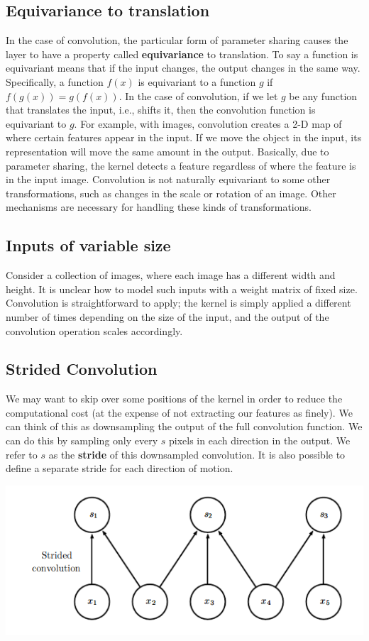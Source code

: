 \subsection{Equivariance to translation}
In the case of convolution, the particular form of parameter sharing causes the layer to have a property called \textbf{equivariance} to translation. To say a function is
equivariant means that if the input changes, the output changes in the same way. Specifically, a function $f(x)$ is equivariant to a function $g$ if $f(g(x)) = g(f(x))$. In the case of convolution, if we let $g$ be any function that translates the input, i.e., shifts it, then the convolution function is equivariant to $g$. For example, with images, convolution creates a 2-D map of where certain features appear in the input. If we move the object in the input, its representation will move the
same amount in the output. Basically, due to parameter sharing, the kernel detects a feature regardless of where the feature is in the input image.\newline\newline
Convolution is not naturally equivariant to some other transformations, such as changes in the scale or rotation of an image. Other mechanisms are necessary for handling these kinds of transformations.

\subsection{Inputs of variable size}
Consider a collection of images, where each image has a different
width and height. It is unclear how to model such inputs with a weight matrix of fixed size. Convolution is straightforward to apply; the kernel is simply applied a different number of times depending on the size of the input, and the output of the convolution operation scales accordingly.

\subsection{Strided Convolution}
We may want to skip over some positions of the kernel in order to reduce the
computational cost (at the expense of not extracting our features as finely).
We can think of this as downsampling the output of the full convolution function. We can do this by sampling only every $s$ pixels in each direction in the output. We refer to $s$ as the \textbf{stride} of this downsampled convolution. It is also possible to define a separate stride for each direction of motion.
\begin{center}
    \includegraphics[scale=0.7]{images/stride.png}
\end{center}

